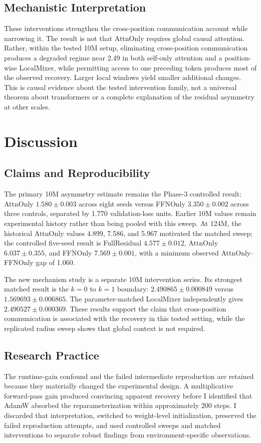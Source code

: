 \documentclass[11pt]{article}
\begin{document}
\subsection{Mechanistic Interpretation}
These interventions strengthen the cross-position communication account while narrowing it. The result is not that AttnOnly requires global causal attention. Rather, within the tested 10M setup, eliminating cross-position communication produces a degraded regime near 2.49 in both self-only attention and a position-wise LocalMixer, while permitting access to one preceding token produces most of the observed recovery. Larger local windows yield smaller additional changes. This is causal evidence about the tested intervention family, not a universal theorem about transformers or a complete explanation of the residual asymmetry at other scales.

\section{Discussion}
\subsection{Claims and Reproducibility}
The primary 10M asymmetry estimate remains the Phase-3 controlled result: AttnOnly $1.580 \pm 0.003$ across eight seeds versus FFNOnly $3.350 \pm 0.002$ across three controls, separated by 1.770 validation-loss units. Earlier 10M values remain experimental history rather than being pooled with this sweep. At 124M, the historical AttnOnly values 4.899, 7.586, and 5.967 motivated the matched sweep; the controlled five-seed result is FullResidual $4.577 \pm 0.012$, AttnOnly $6.037 \pm 0.355$, and FFNOnly $7.569 \pm 0.001$, with a minimum observed AttnOnly--FFNOnly gap of 1.060.

The new mechanism study is a separate 10M intervention series. Its strongest matched result is the $k=0$ to $k=1$ boundary: $2.490865 \pm 0.000849$ versus $1.569693 \pm 0.006865$. The parameter-matched LocalMixer independently gives $2.490527 \pm 0.000369$. These results support the claim that cross-position communication is associated with the recovery in this tested setting, while the replicated radius sweep shows that global context is not required.

\subsection{Research Practice}
The runtime-gain confound and the failed intermediate reproduction are retained because they materially changed the experimental design. A multiplicative forward-pass gain produced convincing apparent recovery before I identified that AdamW absorbed the reparameterization within approximately 200 steps. I discarded that interpretation, switched to weight-level initialization, preserved the failed reproduction attempts, and used controlled sweeps and matched interventions to separate robust findings from environment-specific observations.
\end{document}
